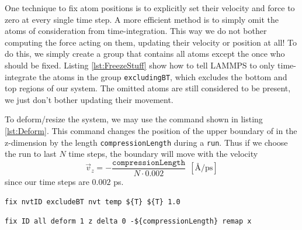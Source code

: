\documentclass[twoside,english]{uiofysmaster}
\begin{document}
One technique to fix atom positions is to explicitly set their velocity and force to zero at every single time step.
A more efficient method is to simply omit the atoms of consideration from time-integration. 
This way we do not bother computing the force acting on them, updating their velocity or position at all! 
To do this, we simply create a group that contains all atoms except the once who should be fixed.
Listing \ref{lst:FreezeStuff} show how to tell LAMMPS to only time-integrate the atoms in the group \texttt{excludingBT}, which excludes the bottom and top regions of our system.
The omitted atoms are still considered to be present, we just don't bother updating their movement.

To deform/resize the system, we may use the command shown in listing \ref{lst:Deform}. 
This command changes the position of the upper boundary of in the z-dimension by the length \texttt{compressionLength} during a \texttt{run}.
Thus if we choose the run to last $N$ time steps, the boundary will move with the velocity 
\begin{equation}
	\vec{v}_z = -\frac{\texttt{compressionLength}}{N\cdot0.002} ~~ [\text{\AA/ps}]
\end{equation}
since our time steps are $0.002$ ps.
\begin{lstlisting}[caption={Time-integrating only atoms in a specified group, \texttt{excludeBT}, effectively fixing all others.}, label={lst:FreezeStuff}, language=LammpsInput]
fix nvtID excludeBT nvt temp ${T} ${T} 1.0
\end{lstlisting}

\begin{lstlisting}[caption={LAMMPS command for deforming the simulation box, and remaping atom positions.}, label={lst:Deform}, language=LammpsInput]
fix ID all deform 1 z delta 0 -${compressionLength} remap x
\end{lstlisting}
 
\end{document}
